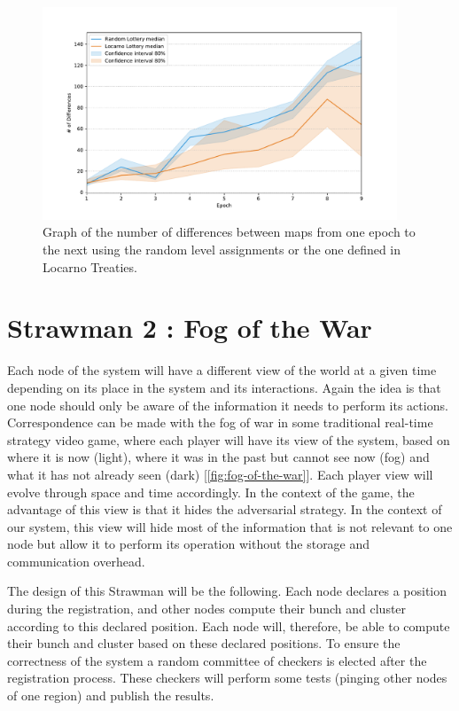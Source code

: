 \documentclass[a4paper,11pt,oneside]{report}
\begin{document}
\begin{figure}[!h] 
\centering
\includegraphics[width=300pt]{figures/LocarnoTreaties-differences}
\caption{Graph of the number of differences between maps from one epoch to the next
using the random level assignments or the one defined in Locarno Treaties. }
\label{fig:LocarnoTreaties-differences} \end{figure}

\section{Strawman 2 : Fog of the War} \label{sec:Fog-of-the-war}

Each node of the system will have a different view of the world at a given time
depending on its place in the system and its interactions. Again the idea is
that one node should only be aware of the information it needs to perform its
actions. Correspondence can be made with the fog of war in some traditional real-time
strategy video game, where each player will have its view of the system,
based on where it is now (light), where it was in the past but
cannot see now (fog) and what it has not already seen (dark) [\autoref{fig:fog-of-the-war}].
Each player view will evolve through space and time accordingly. In the context
of the game, the advantage of this view is that it hides the adversarial
strategy. In the context of our system, this view will hide most of the
information that is not relevant to one node but allow it to perform its
operation without the storage and communication overhead. 

The design of this Strawman will be the following. Each node declares a
position during the registration, and other nodes compute their bunch and
cluster according to this declared position. Each node will, therefore, be able
to compute their bunch and cluster based on these declared positions. To ensure
the correctness of the system a random committee of checkers is elected after
the registration process. These checkers will perform some tests (pinging other
nodes of one region) and publish the results. 
\end{document}
